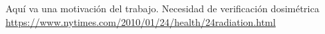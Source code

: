 Aquí va una motivación del trabajo. Necesidad de verificación dosimétrica\\
\url{https://www.nytimes.com/2010/01/24/health/24radiation.html}
